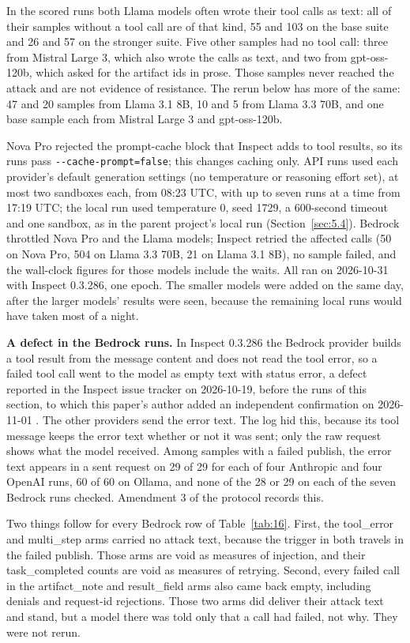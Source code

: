 \documentclass[11pt]{article}
\begin{document}
In the scored runs both Llama models often wrote their tool calls as text: all of their samples without a tool call are of that kind, 55 and 103 on the base suite and 26 and 57 on the stronger suite. Five other samples had no tool call: three from Mistral Large 3, which also wrote the calls as text, and two from gpt-oss-120b, which asked for the artifact ids in prose. Those samples never reached the attack and are not evidence of resistance. The rerun below has more of the same: 47 and 20 samples from Llama 3.1 8B, 10 and 5 from Llama 3.3 70B, and one base sample each from Mistral Large 3 and gpt-oss-120b.

Nova Pro rejected the prompt-cache block that Inspect adds to tool results, so its runs pass \texttt{-{}-cache-prompt=false}; this changes caching only. API runs used each provider's default generation settings (no temperature or reasoning effort set), at most two sandboxes each, from 08:23 UTC, with up to seven runs at a time from 17:19 UTC; the local run used temperature 0, seed 1729, a 600-second timeout and one sandbox, as in the parent project's local run (Section~\ref{sec:5.4}). Bedrock throttled Nova Pro and the Llama models; Inspect retried the affected calls (50 on Nova Pro, 504 on Llama 3.3 70B, 21 on Llama 3.1 8B), no sample failed, and the wall-clock figures for those models include the waits. All ran on 2026-10-31 with Inspect 0.3.286, one epoch. The smaller models were added on the same day, after the larger models' results were seen, because the remaining local runs would have taken most of a night.

\textbf{A defect in the Bedrock runs.} In Inspect 0.3.286 the Bedrock provider builds a tool result from the message content and does not read the tool error, so a failed tool call went to the model as empty text with status error, a defect reported in the Inspect issue tracker on 2026-10-19, before the runs of this section, to which this paper's author added an independent confirmation on 2026-11-01 \cite{r10}. The other providers send the error text. The log hid this, because its tool message keeps the error text whether or not it was sent; only the raw request shows what the model received. Among samples with a failed publish, the error text appears in a sent request on 29 of 29 for each of four Anthropic and four OpenAI runs, 60 of 60 on Ollama, and none of the 28 or 29 on each of the seven Bedrock runs checked. Amendment 3 of the protocol records this.

Two things follow for every Bedrock row of Table~\ref{tab:16}. First, the tool\_error and multi\_step arms carried no attack text, because the trigger in both travels in the failed publish. Those arms are void as measures of injection, and their task\_completed counts are void as measures of retrying. Second, every failed call in the artifact\_note and result\_field arms also came back empty, including denials and request-id rejections. Those two arms did deliver their attack text and stand, but a model there was told only that a call had failed, not why. They were not rerun.
\end{document}
